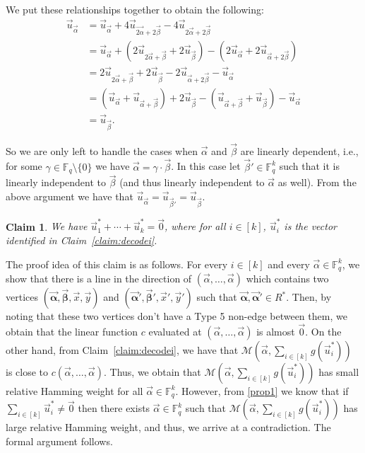 \documentclass[11pt]{article}
\newcommand{\F}{\mathbb{F}}
\newtheorem{claim}[theorem]{Claim}
\newcommand{\alphab}{\vec{\bm{\alpha}}}
\newcommand{\betab}{\vec{\bm{\beta}}}
\newcommand{\M}{\mathcal{M}}
\begin{document}
We put these relationships together to obtain the following:
\begin{align*}
\vec{u}_{\vec{\alpha}}&=\vec{u}_{\vec{\alpha}}+4\vec{u}_{\vec{2\alpha}+2\vec{\beta}}-4\vec{u}_{2\vec{\alpha}+2\vec{\beta}}\\
&=\vec{u}_{\vec{\alpha}}+\left(2\vec{u}_{2\vec{\alpha}+\vec{\beta}}+2\vec{u}_{\vec{\beta}}\right)-\left(2\vec{u}_{\vec{\alpha}}+2\vec{u}_{\vec{\alpha}+2\vec{\beta}}\right)\\
&=2\vec{u}_{2\vec{\alpha}+\vec{\beta}}+2\vec{u}_{\vec{\beta}}-2\vec{u}_{\vec{\alpha}+2\vec{\beta}}-\vec{u}_{\vec{\alpha}}\\
&=\left(\vec{u}_{\vec{\alpha}}+\vec{u}_{\vec{\alpha}+\vec{\beta}}\right)+2\vec{u}_{\vec{\beta}}-\left(\vec{u}_{\vec{\alpha}+\vec{\beta}}+\vec{u}_{\vec{\beta}}\right)-\vec{u}_{\vec{\alpha}}\\
&=\vec{u}_{\vec{\beta}}.
\end{align*}

So we are only left to handle the cases when $\vec{\alpha}$ and $\vec{\beta}$ are linearly dependent, i.e., for some $\gamma\in \F_q\setminus \{0\}$ we have $\vec{\alpha}=\gamma\cdot \vec{\beta}$. In this case let $\vec{\beta}'\in \F_q^k$  such that it is linearly independent to $\vec{\beta}$ (and thus linearly independent to $\vec{\alpha}$ as well). From the above argument we have that $\vec{u}_{\vec{\alpha}}=\vec{u}_{\vec{\beta}'}=\vec{u}_{\vec{\beta}}$.


\begin{claim}\label{claim:testzero}
We have $\vec{u}_1^\ast+\cdots +\vec{u}_k^\ast=\vec{0}$, where for all $i\in[k]$, $\vec{u}_i^\ast$ is the vector identified in Claim~\ref{claim:decodei}. 
\end{claim}

The proof idea of this claim is as follows. For every $i\in[k]$ and every $\vec{\alpha}\in \F_q^k$, we show that there is a line in the direction of $(\vec{\alpha},\ldots ,\vec{\alpha})$ which contains two vertices $(\alphab,\betab,\vec{x},\vec{y})$ and  $(\alphab',\betab',\vec{x}',\vec{y}')$ such that  $\alphab,\alphab'\in R^\ast$. Then, by noting that these two vertices don't have a Type 5 non-edge between them, we obtain that the linear function $c$ evaluated at $(\vec{\alpha},\ldots ,\vec{\alpha})$ is almost $\vec{0}$. On the other hand, from Claim~\ref{claim:decodei}, we have that $\M\left(\vec{\alpha},\underset{i\in[k]}{\sum}g(\vec{u}_i^\ast)\right)$ is close to $c(\vec{\alpha},\ldots ,\vec{\alpha})$. Thus, we obtain that $\M\left(\vec{\alpha},\underset{i\in[k]}{\sum}g(\vec{u}_i^\ast)\right)$ has small relative Hamming weight for all $\vec{\alpha}\in \F_q^k$. However, from  \eqref{prop1} we know that if $\underset{i\in[k]}{\sum}\vec{u}_i^\ast\neq \vec{0}$ then there exists $\vec{\alpha}\in\F_q^k$ such that  $\M\left(\vec{\alpha},\underset{i\in[k]}{\sum}g(\vec{u}_i^\ast)\right)$ has large relative Hamming weight, and thus, we arrive at a contradiction. The formal argument follows.
\end{document}
